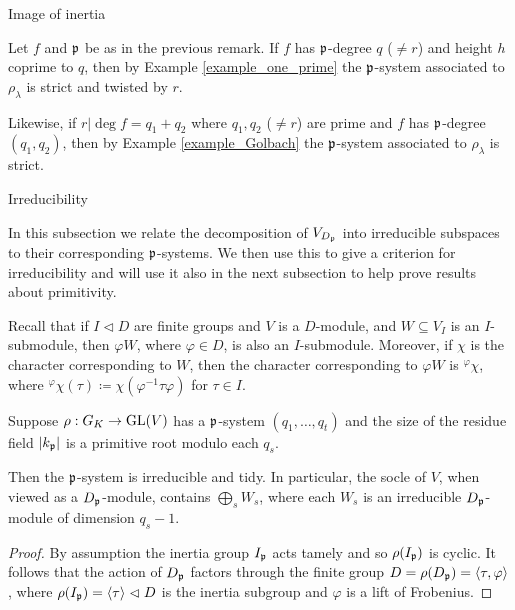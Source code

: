 \documentclass[11pt,a4paper]{article}
\begin{document}
\begin{section}{Image of inertia}
\begin{remark}
\label{remark_p_degree_and_strict_p-systems}
Let $f$ and $\mathfrak{p}$ be as in the previous remark. If $f$ has $\mathfrak{p}$-degree $q$ ($\neq r$) and height $h$ coprime to $q$, then by Example \ref{example_one_prime} the $\mathfrak{p}$-system associated to $\rho_\lambda$ is strict and twisted by $r$.


Likewise, if $r|\deg f = q_1 +q_2$ where $q_1,q_2$ ($\neq r$) are prime and $f$ has $\mathfrak{p}$-degree $(q_1,q_2)$, then by Example \ref{example_Golbach} the $\mathfrak{p}$-system associated to $\rho_\lambda$ is strict.
\end{remark}

\begin{subsection}{Irreducibility}
    
In this subsection we relate the decomposition of $V_{D_{\mathfrak{p}}}$ into irreducible subspaces to their corresponding $\mathfrak{p}$-systems.
We then use this to give a criterion for irreducibility and will use it also in the next subsection to help prove results about primitivity.


Recall that if $I \vartriangleleft D$ are finite groups and $V$ is a $D$-module, and $W \subseteq V_I$ is an $I$-submodule, then $\varphi W$, where $\varphi \in D$, is also an $I$-submodule.
Moreover, if $\chi$ is the character corresponding to $W$, then the character corresponding to $\varphi W$ is $^\varphi\chi$, where $^\varphi\chi(\tau) \coloneqq \chi(\varphi^{-1}\tau \varphi)$ for $\tau \in I$.
\begin{proposition}
\label{irred_blocks_aux_Anni_VladDok}
Suppose $\rho: \GK \rightarrow \GL(V)$ has a $\mathfrak{p}$-system  $(q_1, \ldots, q_t)$ and the size of the residue field $|k_{\mathfrak{p}}|$ is a primitive root modulo each $q_s$.

Then the $\mathfrak{p}$-system is irreducible and tidy.
In particular, the socle of $V$, when viewed as a $D_{\mathfrak{p}}$-module, contains $\bigoplus_{s} W_s$, where each $W_s$ is an irreducible $D_{\mathfrak{p}}$-module of dimension $q_s-1$.  

\end{proposition}

\begin{proof}
By assumption the inertia group $I_{\mathfrak{p}}$ acts tamely and so $\rho(I_{\mathfrak{p}})$ is cyclic. It follows that the action of $D_{\mathfrak{p}}$ factors through the finite group $D = \rho(D_{\mathfrak{p}}) = \langle \tau , \varphi \rangle$, where $\rho(I_{\mathfrak{p}}) = \langle \tau \rangle \vartriangleleft D$ is the inertia subgroup and $\varphi$ is a lift of Frobenius.




\end{proof}
\end{subsection}
\end{section}
\end{document}
